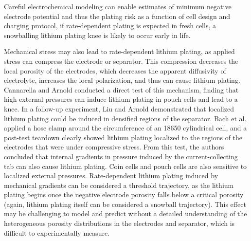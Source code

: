 \documentclass[journal=jpclcd,manuscript=article]{achemso}
\begin{document}
Careful electrochemical modeling can enable estimates of minimum negative electrode potential and thus the plating risk as a function of cell design and charging protocol\cite{yang_understanding_2018}{}, if rate-dependent plating is expected in fresh cells, a snowballing lithium plating knee is likely to occur early in life.

Mechanical stress may also lead to rate-dependent lithium plating, as applied stress can compress the electrode or separator. This compression decreases the local porosity of the electrodes, which decreases the apparent diffusivity of electrolyte, increases the local polarization, and thus can cause lithium plating. Cannarella and Arnold\cite{cannarella_stress_2014} conducted a direct test of this mechanism, finding that high external pressures can induce lithium plating in pouch cells and lead to a knee. In a follow-up experiment, Liu and Arnold\cite{liu_effects_2020} demonstrated that localized lithium plating could be induced in densified regions of the separator. Bach et al.\cite{bach_nonlinear_2016} applied a hose clamp around the circumference of an 18650 cylindrical cell, and a post-test teardown clearly showed lithium plating localized to the regions of the electrodes that were under compressive stress. From this test, the authors concluded that internal gradients in pressure induced by the current-collecting tab can also cause lithium plating. Coin cells and pouch cells are also sensitive to localized external pressures.\cite{liu_size_2018, fuchs_post-mortem_2019, okasinski_situ_2020}
Rate-dependent lithium plating induced by mechanical gradients can be considered a threshold trajectory, as the lithium plating begins once the negative electrode porosity falls below a critical porosity (again, lithium plating itself can be considered a snowball trajectory).
This effect may be challenging to model and predict without a detailed understanding of the heterogeneous porosity distributions in the electrodes and separator, which is difficult to experimentally measure.
\end{document}
